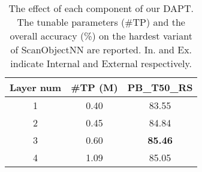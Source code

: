 \begin{table}[!t]
\scriptsize
\setlength{\tabcolsep}{7.5mm}
\centering
\caption{The effect of each component of our DAPT. The tunable parameters (\#TP) and the overall accuracy (\%) on the hardest variant of ScanObjectNN are reported. In. and Ex. indicate Internal and External respectively.}
\vspace{-10pt}
\label{tab:components}

\begin{tabular}{ccc}
\toprule
Layer num & \#TP (M) & PB\_T50\_RS \\
\midrule
1 & 0.40 & 83.55 \\
2 & 0.45 & 84.84 \\
\rowcolor{linecolor!40}3 & 0.60 & \textbf{85.46} \\
4 & 1.09 & 85.05 \\
\bottomrule
\end{tabular}
\vspace{-15pt}
\end{table}
